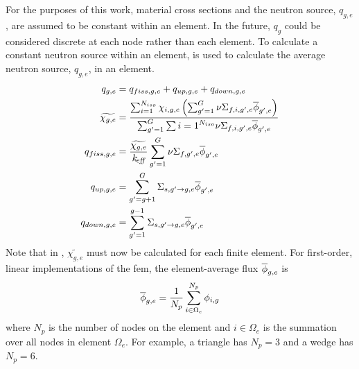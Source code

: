     For the purposes of this work, material cross sections and the neutron
    source, $q_{g,e}$, are assumed to be constant within an element. In the
    future, $q_g$ could be considered discrete at each node rather than each
    element. To calculate a constant neutron source within an element,
     is used to calculate the average neutron source, $q_{g,e}$,
    in an element.
    \begin{align}
      \label{eq:qelement_combined}
      q_{g,e} &= q_{fiss,g,e} + q_{up,g,e} + q_{down,g,e} \\
      \label{eq:chielement}
      \widetilde{\chi_{g,e}} &= \frac{\sum_{i=1}^{N_{iso}} \chi_{i,g,e}
        \left( \sum_{g'=1}^G
        \nu \Sigma_{f,i,g',e} \overline{\phi}_{g',e}\right)} 
        {\sum_{g'=1}^G 
        \sum{i=1}^{N_{iso}} \nu \Sigma_{f,i,g',e} \overline{\phi}_{g',e}} \\
      \label{eq:qelement_fiss}
      q_{fiss,g,e} &= \frac{\widetilde{\chi_{g,e}}}{k_{\!\mbox{\scriptsize \em eff}}} \sum_{g'=1}^G \nu
        \Sigma_{f,g',e} \overline{\phi}_{g',e} \\
      \label{eq:qelement_up}
      q_{up,g,e} &= \sum_{g'=g+1}^G \Sigma_{s,g' \rightarrow g,e}
        \overline{\phi}_{g',e}\\
      \label{eq:qelement_down}
      q_{down,g,e} &= \sum_{g'=1}^{g-1} \Sigma_{s,g' \rightarrow g,e}
        \overline{\phi}_{g',e}
    \end{align}
    Note that in , $\widetilde{\chi_{g,e}}$ must now be
    calculated for each finite element.  For first-order, linear implementations
    of the \gls{fem}, the element-average flux $\overline{\phi}_{g,e}$ is
    \begin{equation}
      \label{eq:phiavg}
      \overline{\phi}_{g,e} = \frac{1}{N_p} \sum_{i \in \Omega_e}^{N_p} \phi_{i,g}
    \end{equation}
    where $N_p$ is the number of nodes on the element and $i \in
    \Omega_e$ is the summation over all nodes in element $\Omega_e$. For 
    example, a triangle has $N_p = 3$ and a wedge has $N_p = 6$.

